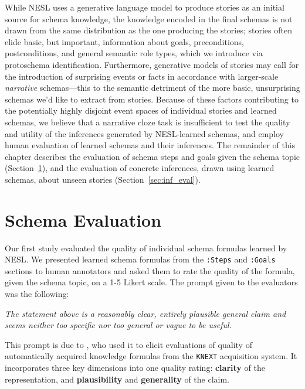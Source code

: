 While NESL uses a generative language model to produce stories as an initial source for schema knowledge, the knowledge encoded in the final schemas is not drawn from the same distribution as the one producing the stories; stories often elide basic, but important, information about goals, preconditions, postconditions, and general semantic role types, which we introduce via protoschema identification. Furthermore, generative models of stories may call for the introduction of surprising events or facts in accordance with larger-scale \textit{narrative} schemas---this to the semantic detriment of the more basic, unsurprising schemas we'd like to extract from stories. Because of these factors contributing to the potentially highly disjoint event spaces of individual stories and learned schemas, we believe that a narrative cloze task is insufficient to test the quality and utility of the inferences generated by NESL-learned schemas, and employ human evaluation of learned schemas and their inferences. The remainder of this chapter describes the evaluation of schema steps and goals given the schema topic (Section~\ref{sec:schema_eval}), and the evaluation of concrete inferences, drawn using learned schemas, about unseen stories (Section~\ref{sec:inf_eval}).

\section{Schema Evaluation}
\label{sec:schema_eval}
Our first study evaluated the quality of individual schema formulas learned by NESL. We presented learned schema formulas from the \texttt{:Steps} and \texttt{:Goals} sections to human annotators and asked them to rate the quality of the formula, given the schema topic, on a 1-5 Likert scale. The prompt given to the evaluators was the following:
\begin{displayquote}
\textit{The statement above is a reasonably clear, entirely plausible general claim and seems neither too specific nor too general or vague to be useful.}
\end{displayquote}
This prompt is due to \citet{knext-eval}, who used it to elicit evaluations of quality of automatically acquired knowledge formulas from the \texttt{KNEXT} acquisition system. It incorporates three key dimensions into one quality rating: \textbf{clarity} of the representation, and \textbf{plausibility} and \textbf{generality} of the claim.

